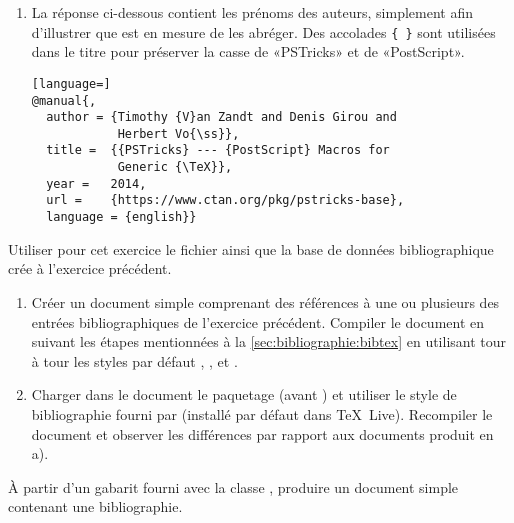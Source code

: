 \begin{exercice}
\begin{sol}
\begin{enumerate}
    \item La réponse ci-dessous contient les prénoms des auteurs,
      simplement afin d'illustrer que {\BibTeX} est en mesure de les
      abréger. Des accolades \verb={ }= sont utilisées dans le titre
      pour préserver la casse de «PSTricks» et de «PostScript».
\begin{lstlisting}[language=]
@manual{,
  author = {Timothy {V}an Zandt and Denis Girou and
            Herbert Vo{\ss}},
  title =  {{PSTricks} --- {PostScript} Macros for
            Generic {\TeX}},
  year =   2014,
  url =    {https://www.ctan.org/pkg/pstricks-base},
  language = {english}}
\end{lstlisting}
    \end{enumerate}
  \end{sol}
\end{exercice}

\begin{exercice}[nosol]
  Utiliser pour cet exercice le fichier
   ainsi que la base de données
  bibliographique crée à l'exercice précédent.
  \begin{enumerate}
  \item Créer un document simple comprenant des références à une ou
    plusieurs des entrées bibliographiques de l'exercice précédent.
    Compiler le document en suivant les étapes mentionnées à la
    \autoref{sec:bibliographie:bibtex} en utilisant tour à tour les
    styles par défaut , ,  et
    .
  \item Charger dans le document le paquetage  (avant
    ) et utiliser le style de bibliographie 
    fourni par  (installé par défaut dans
    {\TeX}~Live). Recompiler le document et observer les différences
    par rapport aux documents produit en a).
  \end{enumerate}
\end{exercice}

\begin{exercice}[nosol]
  À partir d'un gabarit fourni avec la classe ,
  produire un document simple contenant une bibliographie.
\end{exercice}


